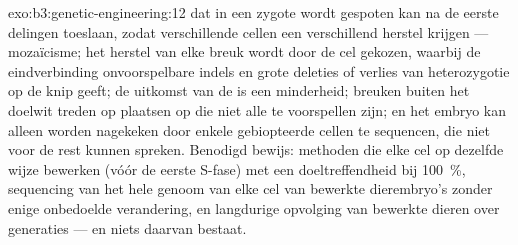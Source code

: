 \begin{solution}{exo:b3:genetic-engineering:12}
 dat in een zygote wordt gespoten kan na de eerste delingen
toeslaan, zodat verschillende cellen een verschillend herstel krijgen
--- mozaïcisme; het herstel van elke breuk wordt door de cel gekozen,
waarbij de eindverbinding onvoorspelbare indels en grote deleties of
verlies van heterozygotie op de knip geeft; de uitkomst van de  is een minderheid; breuken buiten het doelwit treden op
plaatsen op die niet alle te voorspellen zijn; en het embryo kan alleen
worden nagekeken door enkele gebiopteerde cellen te sequencen, die niet
voor de rest kunnen spreken. Benodigd bewijs: methoden die elke cel op
dezelfde wijze bewerken (vóór de eerste S-fase) met een
doeltreffendheid bij \qty{100}{\%}, sequencing van het hele genoom van
elke cel van bewerkte dierembryo's zonder enige onbedoelde verandering,
en langdurige opvolging van bewerkte dieren over generaties --- en niets
daarvan bestaat.
\end{solution}

